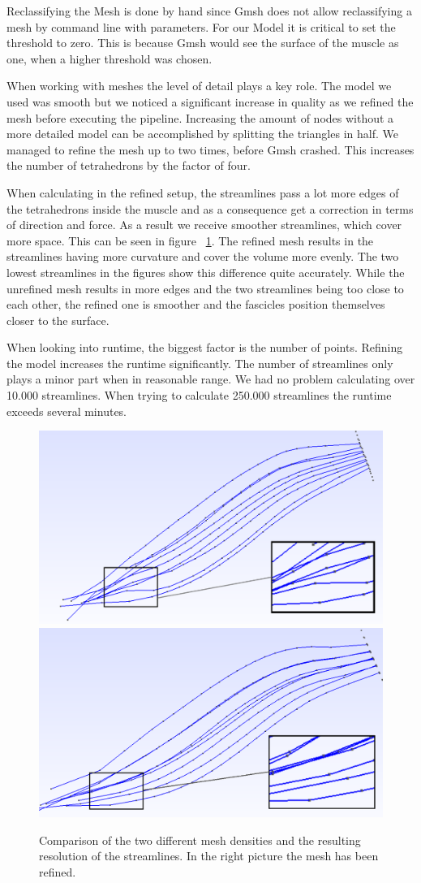 \documentclass[preprint,journal]{vgtc}       %
\begin{document}
Reclassifying the Mesh is done by hand since Gmsh does not allow reclassifying a mesh by command line with parameters. 
For our Model it is critical to set the threshold to zero. 
This is because Gmsh would see the surface of the muscle as one, when a higher threshold was chosen.

When working with meshes the level of detail plays a key role. 
The model we used was smooth but we noticed a significant increase in quality as we refined the mesh before executing the pipeline. 
Increasing the amount of nodes without a more detailed model can be accomplished by splitting the triangles in half.
We managed to refine the mesh up to two times, before Gmsh crashed.
This increases the number of tetrahedrons by the factor of four. 

When calculating in the refined setup, the streamlines pass a lot more edges of the tetrahedrons inside the muscle and as a consequence get a correction in terms of direction and force. 
As a result we receive smoother streamlines, which cover more space. 
This can be seen in figure ~\ref{fig:refStreamlines}.
The refined mesh results in the streamlines having more curvature and cover the volume more evenly.
The two lowest streamlines in the figures show this difference quite accurately.
While the unrefined mesh results in more edges and the two streamlines being too close to each other, the refined one is smoother and the fascicles position themselves closer to the surface.

When looking into runtime, the biggest factor is the number of points.
Refining the model increases the runtime significantly. 
The number of streamlines only plays a minor part when in reasonable range.
We had no problem calculating over 10.000 streamlines. When trying to calculate 250.000 streamlines the runtime exceeds several minutes.

\begin{figure}
	\begin{minipage}{\linewidth}
		\includegraphics[width=.5\linewidth]{Streamlines_zoom.PNG}
		\includegraphics[width=.51\linewidth]{refStreamlines_zoom.PNG}
		\caption{Comparison of the two different mesh densities and the resulting resolution of the streamlines. In the right picture the mesh has been refined.}
		\label{fig:refStreamlines}
	\end{minipage}
\end{figure}
\end{document}

